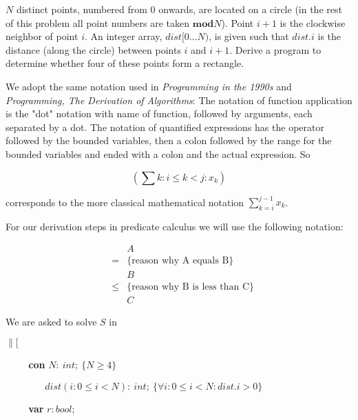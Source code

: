 \vspace{10 mm}
\begin{problem}
$N$ distinct points, numbered from $0$ onwards, are located on a circle (in the rest of this problem all point numbers are taken $\mathbf{mod} N$). Point $i + 1$ is the clockwise neighbor of point $i$. An integer array, $dist[0 \ldots N)$, is given such that $dist.i$ is the distance (along the circle) between points $i$ and  $i + 1$. Derive a program to determine whether four of these points form a rectangle.
\end{problem}

We adopt the same notation used in \textit{Programming in the 1990s} \cite{Cohen90} and \textit{Programming, The Derivation of Algorithms}\cite{Kaldewaij90}: The notation of function application is the "dot" notation with name of function, followed by arguments, each separated by a dot. The notation of quantified expressions has the operator followed by the bounded variables, then a colon followed by the range for the bounded variables and ended with a colon and the actual expression. So

\begin{equation*}	 
	(\sum k : i \leq k < j : x_k)
\end{equation*}

\noindent corresponds to the more classical mathematical notation $\sum_{k = i}^{ j - 1}x_k$. 

\noindent For our derivation steps in predicate calculus we will use the following notation:

\begin{equation*}
\begin{array}{lcl}
		&&A \\
	      &=& \{  \mbox{reason why A equals B} \} \\      
                  &&B \\
                &\leq& \{ \mbox{reason why B is less than C} \} \\
                  && C  
   \end{array}
\end{equation*}

\noindent We are asked to solve $S$ in \medskip

$\|[$

\verb|    | \textbf{con} $N:\ int;\ \{N \geq 4\}$

\verb|        | $dist(i: 0 \leq i < N):\ int;\ \{\forall i: 0 \leq i < N: dist.i > 0\}$

\verb|    | \textbf{var} $r: bool$;

